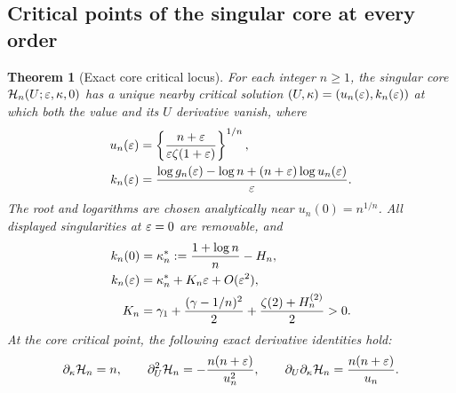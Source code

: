 \documentclass[11pt,a4paper]{article}
\numberwithin{equation}{section}
\newtheorem{theorem}{Theorem}[section]
\theoremstyle{definition}\newtheorem{definition}[theorem]{Definition}
\theoremstyle{remark}\newtheorem{remark}[theorem]{Remark}
\newcommand{\HH}{\mathcal H}
\begin{document}
\subsection{Critical points of the singular core at every order}
\begin{theorem}[Exact core critical locus]\label{thm:corecritical}
For each integer $n\ge1$, the singular core
$\HH_n(U;\eps,\kappa,0)$ has a unique nearby critical solution
$(U,\kappa)=(u_n(\varepsilon),k_n(\varepsilon))$ at which both the value and its $U$
derivative vanish, where
\begin{align}
 u_n(\varepsilon)&=\left\{\frac{n+\varepsilon}{\varepsilon\zeta(1+\varepsilon)}\right\}^{1/n},
       \label{eq:ucore}\\
 k_n(\varepsilon)&=\frac{\log g_n(\varepsilon)-\log n
                        +(n+\varepsilon)\log u_n(\varepsilon)}{\varepsilon}.
       \label{eq:kcore}
\end{align}
The root and logarithms are chosen analytically near
$u_n(0)=n^{1/n}$. All displayed singularities at $\varepsilon=0$ are removable,
and
\begin{align}
 k_n(0)&=\kappa_n^*:=\frac{1+\log n}{n}-H_n,\label{eq:kstar}\\
 k_n(\varepsilon)&=\kappa_n^*+K_n\varepsilon+O(\varepsilon^2),\label{eq:kexpand}\\
 K_n&=\gamma_1+\frac{(\gamma-1/n)^2}{2}
                     +\frac{\zeta(2)+H_n^{(2)}}2>0.\label{eq:Kn}
\end{align}
At the core critical point, the following exact derivative identities hold:
\begin{equation}\label{eq:corederivatives}
 \partial_\kappa\HH_n=n,\qquad
 \partial_U^2\HH_n=-\frac{n(n+\eps)}{u_n^2},\qquad
 \partial_U\partial_\kappa\HH_n=\frac{n(n+\eps)}{u_n}.
\end{equation}
\end{theorem}
\end{document}

